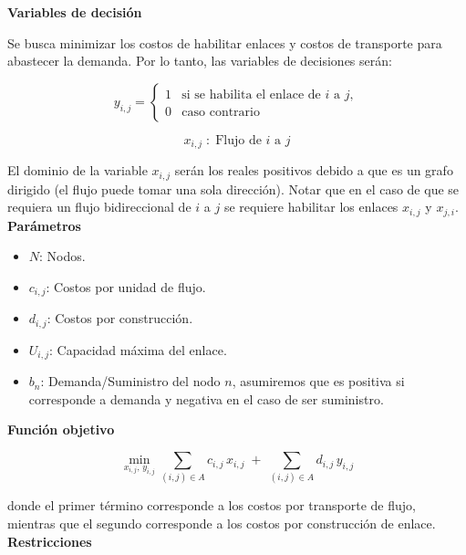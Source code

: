 \textbf{Variables de decisión}

Se busca minimizar los costos de habilitar enlaces y costos de transporte para abastecer la demanda. Por lo tanto, las variables de decisiones serán:

\begin{equation}
y_{i,j} =
\begin{cases}
1 & \text{si se habilita el enlace de } i \text{ a } j, \\
0 & \text{caso contrario}
\end{cases}
\end{equation}

\begin{equation}
x_{i,j} \;:\; \text{Flujo de } i \text{ a } j
\end{equation}

El dominio de la variable $x_{i,j}$ serán los reales positivos debido a que es un grafo dirigido
(el flujo puede tomar una sola dirección). Notar que en el caso de que se requiera un flujo
bidireccional de $i$ a $j$ se requiere habilitar los enlaces $x_{i,j}$ y $x_{j,i}$.\\

\textbf{Parámetros}

\begin{itemize}
    \item $N$: Nodos.
    \item $c_{i,j}$: Costos por unidad de flujo.
    \item $d_{i,j}$: Costos por construcción.
    \item $U_{i,j}$: Capacidad máxima del enlace.
    \item $b_n$: Demanda/Suministro del nodo $n$, asumiremos que es positiva si corresponde a demanda y negativa en el caso de ser suministro.
\end{itemize}

\textbf{Función objetivo}

\begin{equation}
\min_{x_{i,j},\,y_{i,j}} \sum_{(i,j)\in A} c_{i,j}\,x_{i,j} \;+\; \sum_{(i,j)\in A} d_{i,j}\,y_{i,j}
\end{equation}

donde el primer término corresponde a los costos por transporte de flujo, mientras que el segundo corresponde a los costos por construcción de enlace.\\

\textbf{Restricciones}

